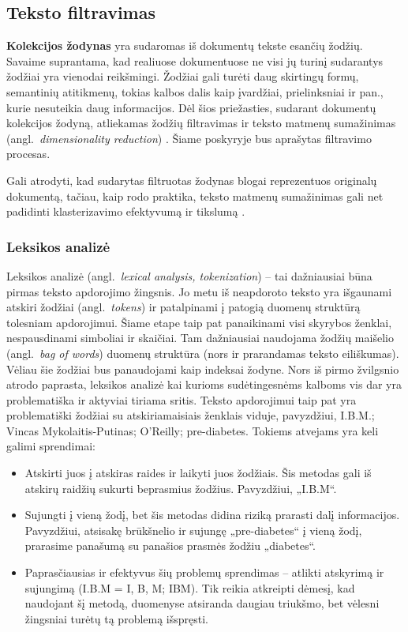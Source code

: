 \documentclass{VUMIFInfKursinis}
\newcommand{\ltang}[2]{#1 (angl.\  \textit{#2}) }
\begin{document}
\subsection{Teksto filtravimas}

\textbf{Kolekcijos žodynas} yra sudaromas iš dokumentų tekste esančių
žodžių. Savaime suprantama, kad realiuose dokumentuose ne visi jų turinį
sudarantys žodžiai yra vienodai reikšmingi. Žodžiai gali turėti daug
skirtingų formų, semantinių atitikmenų, tokias kalbos dalis kaip
įvardžiai, prielinksniai ir pan., kurie nesuteikia daug informacijos.
Dėl šios priežasties, sudarant dokumentų kolekcijos žodyną, atliekamas
žodžių filtravimas ir teksto \ltang{matmenų sumažinimas}{dimensionality reduction}. Šiame poskyryje bus aprašytas
filtravimo procesas.

Gali atrodyti, kad sudarytas filtruotas žodynas blogai reprezentuos
originalų dokumentą, tačiau, kaip rodo praktika, teksto matmenų
sumažinimas gali net padidinti klasterizavimo efektyvumą ir tikslumą \cite{mugunthadevi2011survey}.





\subsubsection{Leksikos analizė}

\ltang{Leksikos analizė}{lexical analysis, tokenization} – tai
dažniausiai būna pirmas teksto apdorojimo žingsnis. Jo metu iš
neapdoroto teksto yra išgaunami atskiri \ltang{žodžiai}{tokens} ir
patalpinami į patogią duomenų struktūrą tolesniam apdorojimui. Šiame
etape taip pat panaikinami visi skyrybos ženklai, nespausdinami
simboliai ir skaičiai. Tam dažniausiai naudojama \ltang{žodžių maišelio}{bag of words} duomenų struktūra (nors ir prarandamas teksto
eiliškumas). Vėliau šie žodžiai bus panaudojami kaip indeksai žodyne.
Nors iš pirmo žvilgsnio atrodo paprasta, leksikos analizė kai kurioms
sudėtingesnėms kalboms vis dar yra problematiška ir aktyviai tiriama
sritis. Teksto apdorojimui taip pat yra problematiški žodžiai su
atskiriamaisiais ženklais viduje, pavyzdžiui, I.B.M.; Vincas
Mykolaitis-Putinas; O'Reilly; pre-diabetes. Tokiems atvejams yra keli
galimi sprendimai:

\begin{itemize}
\item
  Atskirti juos į atskiras raides ir laikyti juos žodžiais. Šis metodas
  gali iš atskirų raidžių sukurti beprasmius žodžius. Pavyzdžiui,
  „I.B.M“.
\item
  Sujungti į vieną žodį, bet šis metodas didina riziką prarasti dalį
  informacijos. Pavyzdžiui, atsisakę brūkšnelio ir sujungę
  „pre-diabetes“ į vieną žodį, prarasime panašumą su panašios prasmės
  žodžiu „diabetes“.
\item
  Paprasčiausias ir efektyvus šių problemų sprendimas – atlikti
  atskyrimą ir sujungimą (I.B.M = I, B, M; IBM). Tik reikia atkreipti
  dėmesį, kad naudojant šį metodą, duomenyse atsiranda daugiau triukšmo,
  bet vėlesni žingsniai turėtų tą problemą išspręsti.
\end{itemize}
\end{document}
